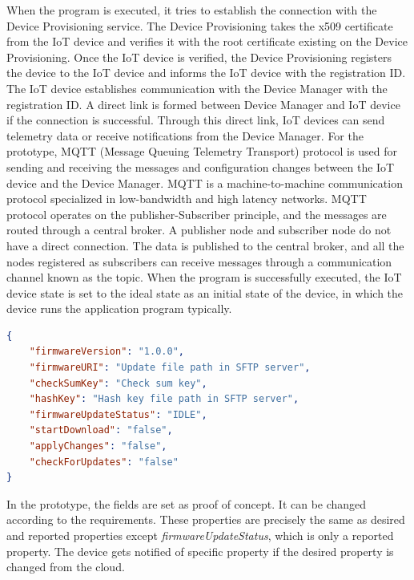 \documentclass[12pt,a4paper]{article}
\begin{document}
{When the program is executed, it tries to establish the connection with the Device Provisioning service. The Device Provisioning takes the x509 certificate from the IoT device and verifies it with the root certificate existing on the Device Provisioning. Once the IoT device is verified, the Device Provisioning registers the device to the IoT device and informs the IoT device with the registration ID. The IoT device establishes communication with the Device Manager with the registration ID. A direct link is formed between Device Manager and IoT device if the connection is successful. Through this direct link, IoT devices can send telemetry data or receive notifications from the Device Manager. For the prototype, MQTT (Message Queuing Telemetry Transport) protocol is used for sending and receiving the messages and configuration changes between the IoT device and the Device Manager. MQTT is a machine-to-machine communication protocol specialized in low-bandwidth and high latency networks. MQTT protocol operates on the publisher-Subscriber principle, and the messages are routed through a central broker. A publisher node and subscriber node do not have a direct connection. The data is published to the central broker, and all the nodes registered as subscribers can receive messages through a communication channel known as the topic. \cite{r38} When the program is successfully executed, the IoT device state is set to the ideal state as an initial state of the device, in which the device runs the application program typically. \\


\begin{lstlisting}[language=json,firstnumber=1]
{
	"firmwareVersion": "1.0.0",
	"firmwareURI": "Update file path in SFTP server",
	"checkSumKey": "Check sum key",
	"hashKey": "Hash key file path in SFTP server",
	"firmwareUpdateStatus": "IDLE",
	"startDownload": "false",
	"applyChanges": "false",
	"checkForUpdates": "false"
}
\end{lstlisting}

In the prototype, the fields are set as proof of concept. It can be changed according to the requirements. These properties are precisely the same as desired and reported properties except \textit{firmwareUpdateStatus}, which is only a reported property. The device gets notified of specific property if the desired property is changed from the cloud.

}
\end{document}
